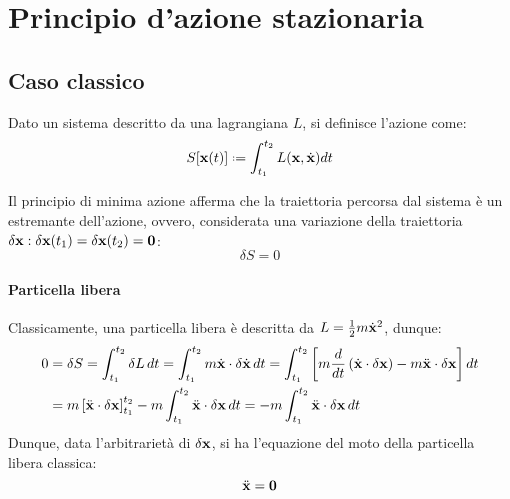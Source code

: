 
\section{Principio d'azione stazionaria}

\subsection{Caso classico}

\begin{definition}
	Dato un sistema descritto da una lagrangiana $ L $, si definisce l'azione come:
	\begin{equation}
		S[\ve{x}(t)] \defeq \int_{t_1}^{t_2} L(\ve{x}, \dot{\ve{x}}) dt
		\label{eq:5.1}
	\end{equation}
\end{definition}

Il principio di minima azione afferma che la traiettoria percorsa dal sistema è un estremante dell'azione, ovvero, considerata una variazione della traiettoria $ \delta\mathbf{x} : \delta\mathbf{x}(t_1) = \delta\mathbf{x}(t_2) = \mathbf{0} $:
\begin{equation}
	\delta S = 0
	\label{eq:5.2}
\end{equation}

\paragraph{Particella libera}

Classicamente, una particella libera è descritta da $ L = \frac{1}{2} m \dot{\mathbf{x}}^2 $, dunque:
\begin{equation*}
	\begin{split}
		0
		&= \delta S = \int_{t_1}^{t_2} \delta L \,dt = \int_{t_1}^{t_2} m \dot{\mathbf{x}} \cdot \delta\dot{\mathbf{x}} \,dt = \int_{t_1}^{t_2} \left[ m \frac{d}{dt} \left( \dot{\mathbf{x}} \cdot \delta\mathbf{x} \right) - m \ddot{\mathbf{x}} \cdot \delta\mathbf{x} \right] dt\\
		&= m \left[ \ddot{\mathbf{x}} \cdot \delta\mathbf{x} \right]_{t_1}^{t_2} - m \int_{t_1}^{t_2} \ddot{\mathbf{x}} \cdot \delta\mathbf{x} \,dt = -m \int_{t_1}^{t_2} \ddot{\mathbf{x}} \cdot \delta\mathbf{x} \,dt
	\end{split}
\end{equation*}
Dunque, data l'arbitrarietà di $ \delta\mathbf{x} $, si ha l'equazione del moto della particella libera classica:
\begin{equation}
	\ddot{\mathbf{x}} = \mathbf{0}
	\label{eq:5.3}
\end{equation}

